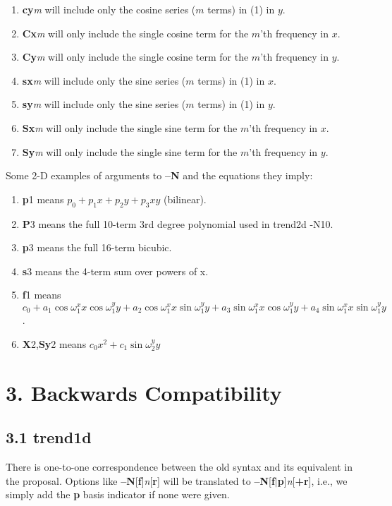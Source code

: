 \documentclass[12pt,letterpaper,margin=0.5in]{report}
\begin{document}
\begin{enumerate}
	\item {\bf cy}{\it m} will include only the cosine series ($m$ terms) in (1) in $y$.
	\item {\bf Cx}{\it m} will only include the single cosine term for the $m$'th frequency in $x$.
	\item {\bf Cy}{\it m} will only include the single cosine term for the $m$'th frequency in $y$.
	\item {\bf sx}{\it m} will include only the sine series ($m$ terms) in (1) in $x$.
	\item {\bf sy}{\it m} will include only the sine series ($m$ terms) in (1) in $y$.
	\item {\bf Sx}{\it m} will only include the single sine term for the $m$'th frequency in $x$.
	\item {\bf Sy}{\it m} will only include the single sine term for the $m$'th frequency in $y$.
\end{enumerate}
Some 2-D examples of arguments to {\bf --N} and the equations they imply:
\begin{enumerate}
	\item {\bf p}1 means $p_0 + p_1 x + p_2 y + p_3xy$ (bilinear).
	\item {\bf P}3 means the full 10-term 3rd degree polynomial used in trend2d -N10.
	\item {\bf p}3 means the full 16-term bicubic.
	\item {\bf s}3 means the 4-term sum over powers of x.
	\item {\bf f}1 means $c_0 + a_1\cos \omega^x_1 x \cos \omega ^y_1 y + a_2\cos \omega^x_1 x \sin \omega ^y_1 y + a_3\sin \omega^x_1 x \cos \omega ^y_1 y + a_4\sin \omega^x_1 x \sin \omega ^y_1 y$.
	\item {\bf X}2,{\bf Sy}2 means $c_0 x^2 + c_1 \sin \omega^y_2 y$
\end{enumerate}

\section*{3. Backwards Compatibility}

\subsection*{3.1 trend1d}
There is one-to-one correspondence between the old syntax and its equivalent
in the proposal.  Options like {\bf --N}[{\bf f}]{\it n}[{\bf r}] will be translated to {\bf --N}[{\bf f}$|${\bf p}]{\it n}[{\bf +r}], i.e.,
we simply add the {\bf p} basis indicator if none were given.
\end{document}
